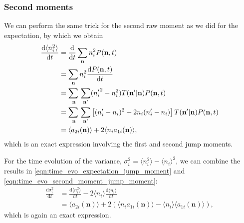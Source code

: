 \documentclass[a4paper,11pt]{report}
\numberwithin{equation}{section}
\newcommand{\diff}[2]{\frac{\mathrm{d} #1}{\mathrm{d} #2}}
\newcommand{\V}[1]{\mathbf{#1}}
\newcommand{\E}[1]{\langle #1 \rangle}
\begin{document}
\subsubsection{Second moments}
We can perform the same trick for the second raw moment as we did for the
expectation, by which we obtain
\begin{equation}
    \begin{aligned}
        \diff{\E{n_i^2}}{t} &= \diff{}{t} \sum_{\V{n}} n_i^2 P(\V{n},t)\\
        &= \sum_{\V{n}} n_i^2 \diff{P(\V{n},t)}{t}\\
        &= \adjustlimits\sum_{\V{n}} \sum_{\V{n}'} ({n_i'}^2 - n_i^2) T(\V{n}' |
        \V{n}) P(\V{n},t)\\
        &= \adjustlimits\sum_{\V{n}} \sum_{\V{n}'} \left[ (n_i' - n_i)^2 + 2n_i(n_i'
        - n_i) \right] T(\V{n}' | \V{n}) P(\V{n},t)\\
        &= \E{a_{2i}(\V{n})} + 2 \E{n_i a_{1i}(\V{n})},
    \end{aligned}
    \label{eqn:time_evo_second_moment_jump_moment}
\end{equation}
which is an exact expression involving the first and second jump moments.

For the time evolution of the variance, \(\sigma_i^2 = \E{n_i^2} - \E{n_i}^2\),
we can combine the results in \eqref{eqn:time_evo_expectation_jump_moment} and
\eqref{eqn:time_evo_second_moment_jump_moment}:
\begin{equation}
    \begin{aligned}
        \diff{\sigma_i^2}{t} &= \diff{\E{n_i^2}}{t} - 2 \E{n_i}\diff{\E{n_i}}{t}\\
        &= \E{a_{2i}(\V{n})} + 2\left( \E{n_i a_{1i}(\V{n})} - \E{n_i}
        \E{a_{1i}(\V{n})} \right),
    \end{aligned}
    \label{eqn:time_evo_variance_jump_moment}
\end{equation}
which is again an exact expression.
\end{document}
